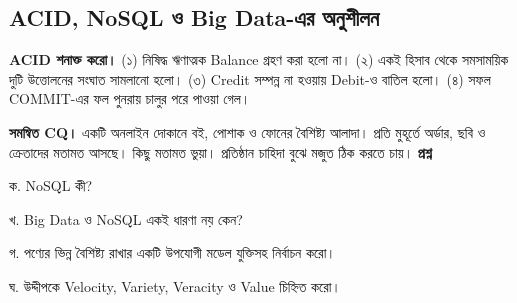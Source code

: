 \subsection{ACID, NoSQL ও Big Data-এর অনুশীলন}
\textbf{ACID শনাক্ত করো।} (১) নিষিদ্ধ ঋণাত্মক Balance গ্রহণ করা হলো না। (২) একই হিসাব থেকে সমসাময়িক দুটি উত্তোলনের সংঘাত সামলানো হলো। (৩) Credit সম্পন্ন না হওয়ায় Debit-ও বাতিল হলো। (৪) সফল COMMIT-এর ফল পুনরায় চালুর পরে পাওয়া গেল।

\textbf{সমন্বিত CQ।} একটি অনলাইন দোকানে বই, পোশাক ও ফোনের বৈশিষ্ট্য আলাদা। প্রতি মুহূর্তে অর্ডার, ছবি ও ক্রেতাদের মতামত আসছে। কিছু মতামত ভুয়া। প্রতিষ্ঠান চাহিদা বুঝে মজুত ঠিক করতে চায়।
\textbf{প্রশ্ন}\par
ক. NoSQL কী?\par
খ. Big Data ও NoSQL একই ধারণা নয় কেন?\par
গ. পণ্যের ভিন্ন বৈশিষ্ট্য রাখার একটি উপযোগী মডেল যুক্তিসহ নির্বাচন করো।\par
ঘ. উদ্দীপকে Velocity, Variety, Veracity ও Value চিহ্নিত করো।
